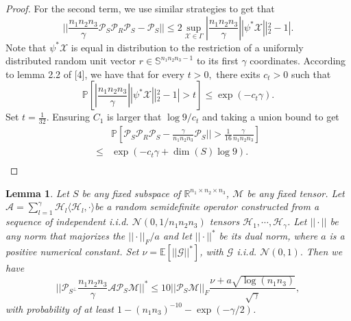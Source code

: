 \documentclass[journal,transmag]{IEEEtran}
\newtheorem{lemma}{Lemma}[section]
\theoremstyle{plain}
\begin{document}
\begin{proof}
For the second term, we use similar strategies to get that
\begin{equation}
||\frac{n_1 n_2 n_3}{\gamma} \mathcal{P}_S \mathcal{P}_R \mathcal{P}_{S} -\mathcal{P}_S|| \le 2 \sup_{\mathcal{X}\in \Gamma}|\frac{n_1 n_2 n_3}{\gamma}||\psi^*\mathcal{X}||^2_2-1|.
\end{equation}
Note that $\psi^*\mathcal{X}$ is equal in distribution to the restriction of a uniformly distributed random unit vector $r \in \mathbb{S}^{n_1 n_2 n_3-1}$ to its first $\gamma$ coordinates. According to lemma 2.2 of [4], we have that for every $t>0,$ there exits $c_t>0$ such that
\begin{equation}
\mathbb{P}[|\frac{n_1 n_2 n_3}{\gamma}||\psi^*\mathcal{X}||^2_2-1|>t]\le \exp(-c_t\gamma).
\end{equation}
Set $t=\frac{1}{32}.$ Ensuring $C_1$ is larger that $\log9/c_t$ and taking a union bound to get
\begin{equation}
\begin{split}
&\mathbb{P}[\mathcal{P}_S\mathcal{P}_R\mathcal{P}_S-\frac{\gamma}{n_1 n_2 n_3}\mathcal{P}_S||>\frac{1}{16}\frac{\gamma}{n_1 n_2 n_3}] \\
\le& \exp(-c_t \gamma+\dim(S)\log 9). \\
\end{split}
\end{equation}
\end{proof}

\begin{lemma} \label{prob2}
Let $S$ be any fixed subspace of $\mathbb{R}^{n_1 \times n_2 \times n_3}$, $\mathcal{M}$ be any fixed tensor. Let $\mathcal{A}=\sum^{\gamma}_{l=1}\mathcal{H}_l\langle\mathcal{H}_l,\cdot\rangle $be a random semidefinite operator constructed from a sequence of independent i.i.d. $\mathcal{N}(0,1/n_1 n_2 n_3)$ tensors $\mathcal{H}_1,\cdots,\mathcal{H}_{\gamma}$. Let $||\cdot||$ be any norm that majorizes the $||\cdot||_F/a$ and let $||\cdot||^*$ be its dual norm, where $a$ is a positive numerical constant. Set $\nu=\mathbb{E}[||\mathcal{G}||^*]$, with $\mathcal{G}$ i.i.d. $\mathcal{N}(0,1).$ Then we have
\begin{equation}
||\mathcal{P}_{S^{\bot}}\frac{n_1 n_2 n_3}{\gamma}\mathcal{A}\mathcal{P}_S \mathcal{M}||^*\le 10 ||\mathcal{P}_S \mathcal{M}||_F \frac{\nu+a \sqrt{\log(n_1 n_3)}}{\sqrt{\gamma}},
\end{equation}
with probability of at least $1-(n_1 n_3)^{-10}-\exp(-\gamma/2)$.
\end{lemma}
\end{document}
